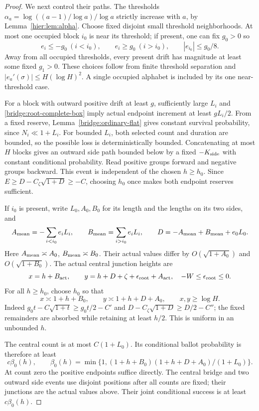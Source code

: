 \begin{proof}
We next control their paths. The thresholds
$\alpha_a=\log((a-1)/\log a)/\log a$ strictly increase with $a$,
by Lemma~\ref{hier:lem:alpha}. Choose fixed disjoint small threshold
neighborhoods. At most one occupied block $i_0$ is near its threshold;
if present, one can fix $g_0>0$ so
\[
 e_i\le-g_0\ (i<i_0),\qquad e_i\ge g_0\ (i>i_0),
                  \qquad |e_{i_0}|\le g_0/8.
\]
Away from all occupied thresholds, every present drift has magnitude
at least some fixed $g_1>0$. These choices follow from finite
threshold separation and $|e_a'(\sigma)|\le H(\log H)^2$.
A single occupied alphabet is included by its one near-threshold case.

For a block with outward positive drift at least $g$, sufficiently
large $L_i$ and \eqref{bridge:root-complete-box} imply actual
endpoint increment at least $gL_i/2$. From a fixed reserve,
Lemma~\ref{bridge:ordinary-flat} gives constant survival probability,
since $N_i\ll1+L_i$. For bounded $L_i$, both selected count and
duration are bounded, so the possible loss is deterministically
bounded. Concatenating at most $H$ blocks gives an outward side path
bounded below by a fixed $-K_{\rm side}$ with constant conditional
probability. Read positive groups forward and negative groups
backward. This event is independent of the chosen $h\ge h_0$.
Since $E\ge D-C_\zeta\sqrt{1+D}\ge-C$, choosing $h_0$ once
makes both endpoint reserves sufficient.

If $i_0$ is present, write $L_0,A_0,B_0$ for its length and the
lengths on its two sides, and
\[
 A_{\rm mean}=-\sum_{i<i_0}e_iL_i,\qquad
 B_{\rm mean}=\sum_{i>i_0}e_iL_i,\qquad
 D=-A_{\rm mean}+B_{\rm mean}+e_0L_0.
\]
Here $A_{\rm mean}\asymp A_0$, $B_{\rm mean}\asymp B_0$.
Their actual values differ by $O(\sqrt{1+A_0})$ and
$O(\sqrt{1+B_0})$. The actual central junction heights are
\[
 x=h+B_{\rm act},\qquad
 y=h+D+\zeta+\epsilon_{\rm root}+A_{\rm act},
                  \quad -W\le\epsilon_{\rm root}\le0.
\]
For all $h\ge h_0$, choose $h_0$ so that
\begin{equation}
 x\asymp1+h+B_0,\qquad y\asymp1+h+D+A_0,\qquad x,y\ge\log H.
 \label{bridge:root-reserves}
\end{equation}
Indeed $g_0t-C\sqrt{1+t}\ge g_0t/2-C'$ and
$D-C_\zeta\sqrt{1+D}\ge D/2-C''$; the fixed remainders are
absorbed while retaining at least $h/2$. This is uniform in an
unbounded $h$.

The central count is at most $C(1+L_0)$. Its conditional ballot
probability is therefore at least
\[
 c\beta_0(h),\qquad
 \beta_0(h)=\min\{1,(1+h+B_0)(1+h+D+A_0)/(1+L_0)\}.
\]
At count zero the positive endpoints suffice directly. The central
bridge and two outward side events use disjoint positions after all
counts are fixed; their junctions are the actual values above.
Their joint conditional success is at least $c\beta_0(h)$.


\end{proof}
